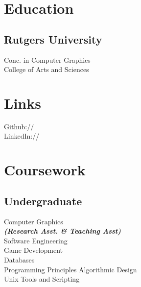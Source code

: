 \documentclass[]{deedy-resume-openfont}
\begin{document}
%
%


%
%

\begin{minipage}[t]{0.33\textwidth} 


\section{Education} 

\subsection{Rutgers University}
\sectionsep

Conc. in Computer Graphics \\
College of Arts and Sciences \\

\sectionsep


\section{Links} 
Github:// \href{https://github.com/11}
{} \\
LinkedIn://  \href{https://www.linkedin.com/in/DougRudolphJr}{} \\
\sectionsep


\section{Coursework}
\subsection{Undergraduate}
Computer Graphics \\
{\footnotesize \textit{\textbf{(Research Asst. \& Teaching Asst) }}} \\
Software Engineering \\
Game Development \\
Databases \\
Programming Principles
Algorithmic Design \\ 
Unix Tools and Scripting \\
\sectionsep


\end{minipage}
\end{document}
